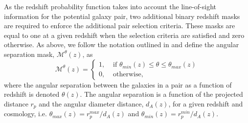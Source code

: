 As the redshift probability function takes into account the line-of-sight information for the potential galaxy pair, two additional binary redshift masks are required to enforce the additional pair selection criteria. These masks are equal to one at a given redshift when the selection criteria are satisfied and zero otherwise. As above, we follow the notation outlined in  and define the angular separation mask, $\mathcal{M}^{\theta}(z)$, as
\begin{equation}
\mathcal{M}^{\theta}(z) = 
\begin{cases}
1, & \text{ if } \theta_{min}(z) \leq \theta \leq \theta_{max}(z) \\ 
0, & \text{ otherwise, } 
\end{cases}
\end{equation}
where the angular separation between the galaxies in a pair as a function of redshift is denoted $\theta (z)$. The angular separation is a function of the projected distance $r_{p}$ and the angular diameter distance, $d_{A}(z)$, for a given redshift and cosmology, i.e. $\theta_{max}(z) = r^{max}_{p} / d_{A}(z)$ and $\theta_{min}(z) = r^{min}_{p} / d_{A}(z)$.

